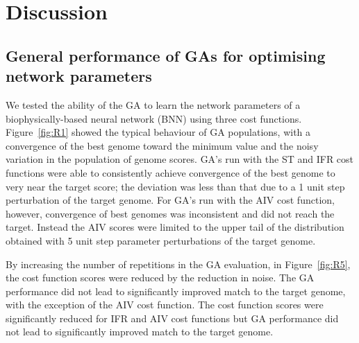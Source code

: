 






\section{Discussion}\label{sec:GA:discussion}

\subsection{General performance of GAs for optimising network parameters}\label{sec:GA:general-perf}

We tested the ability of the GA to learn the network parameters of a
biophysically-based neural network (BNN) using three cost
functions. Figure~\ref{fig:R1} showed the typical behaviour of GA populations,
with a convergence of the best genome toward the minimum value and the noisy
variation in the population of genome scores. GA's run with the ST and IFR cost
functions were able to consistently achieve convergence of the best genome to
very near the target score; the deviation was less than that due to a 1 unit
step perturbation of the target genome. For GA's run with the AIV cost function,
however, convergence of best genomes was inconsistent and did not reach the
target. Instead the AIV scores were limited to the upper tail of the
distribution obtained with 5 unit step parameter perturbations of the target
genome.

\medskip{}

By increasing the number of repetitions in the GA evaluation, in
Figure~\ref{fig:R5}, the cost function scores were reduced by the reduction in
noise. The GA performance did not lead to significantly improved match to the
target genome, with the exception of the AIV cost function.  The cost function
scores were significantly reduced for IFR and AIV cost functions but GA
performance did not lead to significantly improved match to the target genome.



